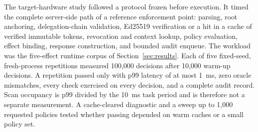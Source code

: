 \ifzonecaphardware
The target-hardware study followed a protocol frozen before execution. It timed the complete server-side path of a reference enforcement point: parsing, root anchoring, delegation-chain validation, Ed25519 verification or a hit in a cache of verified immutable tokens, revocation and context lookup, policy evaluation, effect binding, response construction, and bounded audit enqueue. The workload was the five-effect runtime corpus of Section~\ref{sec:results}. Each of five fixed-seed, fresh-process repetitions measured 100,000 decisions after 10,000 warm-up decisions. A repetition passed only with p99 latency of at most 1~ms, zero oracle mismatches, every check exercised on every decision, and a complete audit record. Scan occupancy is p99 divided by the 10~ms task period and is therefore not a separate measurement. A cache-cleared diagnostic and a sweep up to 1,000 requested policies tested whether passing depended on warm caches or a small policy set.
\fi
